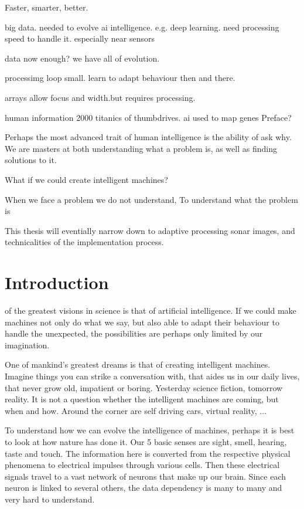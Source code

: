 Faster, smarter, better.

big data. needed to evolve ai intelligence. e.g. deep learning.  need processing speed to handle it. especially near sensors

data now enough? we have all of evolution.

processimg loop small. learn to adapt behaviour then and there.

arrays allow focus and width.but requires processing.

human information 2000 titanics of thumbdrives. ai used to map genes 
Preface?


Perhaps the most advanced trait of human intelligence is the ability of ask why. We are masters at both understanding what a problem is, as well as finding solutions to it. 

What if we could create intelligent machines? 

When we face a problem we do not understand, To understand what the problem is

This thesis will eventially narrow down to adaptive processing sonar images, and technicalities of the implementation process.


\chapter{Introduction}

 of the greatest visions in science is that of artificial intelligence. If we could make machines not only do what we say, but also able to adapt their behaviour to handle the unexpected, the possibilities are perhaps only limited by our imagination.

One of mankind's greatest dreams is that of creating intelligent machines. Imagine things you can strike a conversation with, that aides us in our daily lives, that never grow old, impatient or boring. Yesterday science fiction, tomorrow reality. It is not a question whether the intelligent machines are coming, but when and how. Around the corner are self driving cars, virtual reality, ...

To understand how we can evolve the intelligence of machines, perhaps it is best to look at how nature has done it. Our 5 basic senses are sight, smell, hearing, taste and touch. The information here is converted from the respective physical phenomena to electrical impulses through various cells. Then these electrical signals travel to a vast network of neurons that make up our brain. Since each neuron is linked to several others, the data dependency is many to many and very hard to understand.


